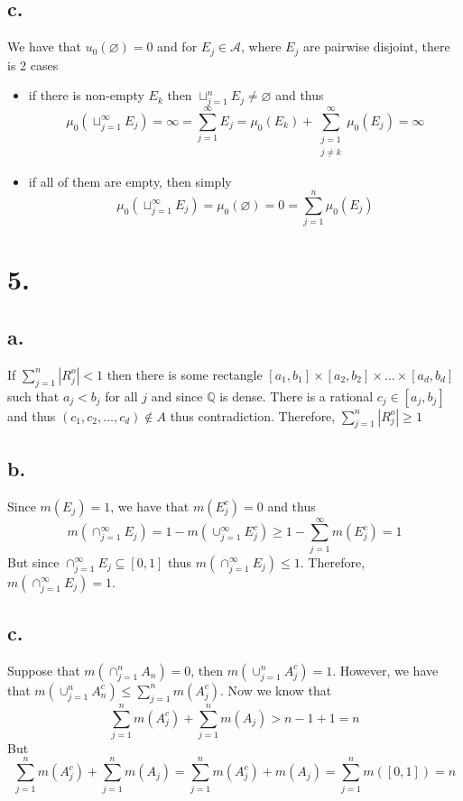 \documentclass[11pt]{article}
\theoremstyle{mystyle}
\theoremstyle{definition}
\begin{document}
\subsection*{c.}
We have that $u_0(\varnothing) = 0$ and for $E_j \in \mathcal{A}$, where $E_j$ are pairwise disjoint, there is 2 cases
\begin{itemize}
  \item if there is non-empty $E_k$ then $\sqcup_{j=1}^n E_j \ne \varnothing$ and thus 
    \[
      \mu_0(\sqcup_{j=1}^\infty E_j ) = \infty = \sum_{j=1}^\infty E_j = \mu_0(E_k) + \sum_{\substack{j=1 \\ j \ne k}}^\infty \mu_0(E_j) = \infty 
    \]
  \item if all of them are empty, then simply
    \[
      \mu_0(\sqcup_{j=1}^\infty E_j) = \mu_0(\varnothing) = 0 = \sum_{j=1}^n \mu_0(E_j) 
    \]
\end{itemize}
\newpage
\section*{5.}
\subsection*{a.}
If $\sum_{j=1}^n |R_j^o| < 1$ then there is some rectangle $[a_1, b_1] \times [a_2, b_2] \times \hdots \times [a_d, b_d]$ such that $a_j < b_j$ for all $j$ and since $\mathbb{Q}$ is dense. There is a rational $c_j \in [a_j, b_j]$ and thus $(c_1, c_2, \hdots, c_d) \notin A$ thus contradiction. Therefore, $\sum_{j=1}^n |R_j^o| \ge 1$
\subsection*{b.}
Since $m(E_j) = 1$, we have that $m(E_j^c) = 0$ and thus  
\[ 
  m(\cap_{j=1}^\infty E_j) = 1 - m(\cup_{j=1}^\infty E_j^c) \ge 1 - \sum_{j=1}^\infty m(E_j^c) = 1 
\]
But since $\cap_{j=1}^\infty E_j \subseteq [0,1]$ thus $m(\cap_{j=1}^\infty E_j) \le 1$. Therefore, $m(\cap_{j=1}^\infty E_j) = 1$. 
\subsection*{c.}
Suppose that $m(\cap_{j=1}^n A_n) = 0$, then $m(\cup_{j=1}^n A_j^c) = 1$. However, we have that $m(\cup_{j=1}^n A_n^c) \le \sum_{j=1}^n m(A_j^c)$. 
Now we know that 
\[ 
  \sum_{j=1}^n m(A_j^c) + \sum_{j=1}^n m(A_j) > n-1 + 1 = n
\]
But 
\[
  \sum_{j=1}^n m(A_j^c) + \sum_{j=1}^n m(A_j) = \sum_{j=1}^n m(A_j^c) + m(A_j) = \sum_{j=1}^n m([0,1]) = n
\]
\end{document}

